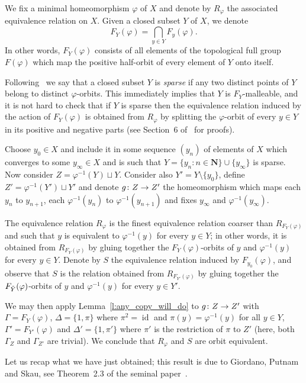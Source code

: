 \documentclass[AHL,Unicode]{cedram}
\DeclareMathOperator{\id}{id}
\newcommand{\N}{\mathbf{N}}
\let\oldtilde\tilde
\renewcommand*{\tilde}[1]{\mathchoice{\widetilde{#1}}{\widetilde{#1}}{\oldtilde{#1}}{\oldtilde{#1}}}
\renewcommand*{\to}{\mathchoice{\longrightarrow}{\rightarrow}{\rightarrow}{\rightarrow}}
\begin{document}
We fix a minimal homeomorphism $\varphi$ of $X$ and denote by $R_\varphi$ the associated equivalence relation on $X$. Given a closed subset $Y$ of $X$, we denote
\[
F_Y(\varphi) = \bigcap_{y \in Y} F_y(\varphi).
\]
In other words, $F_Y(\varphi)$ consists of all elements of the topological full group $F(\varphi)$ which map the positive half-orbit of every element of $Y$ onto itself.

Following~\cite{Melleray2023} we say that a closed subset $Y$ is \emph{sparse} if any two distinct points of $Y$ belong to distinct $\varphi$-orbits. This immediately implies that $Y$ is $F_Y$-malleable, and it is not hard to check that if $Y$ is sparse then the equivalence relation induced by the action of $F_Y(\varphi)$ is obtained from $R_\varphi$ by splitting the $\varphi$-orbit of every $y \in Y$ in its positive and negative parts (see Section~6 of~\cite{Melleray2023} for proofs).

Choose $y_0 \in X$ and include it in some sequence $(y_n)$ of elements of $X$ which converges to some $y_\infty \in X$ and is such that $Y=\{y_n : n \in \N\} \cup\{y_\infty\}$ is sparse. Now consider $Z = \varphi^{-1}(Y) \sqcup Y$. Consider also $Y' = Y \setminus \{y_0\}$, define $Z' = \varphi^{-1}(Y') \sqcup Y'$ and denote $g \colon Z \to Z'$ the homeomorphism which maps each $y_n$ to $y_{n+1}$, each $\varphi^{-1}(y_n)$ to $\varphi^{-1}(y_{n+1})$ and fixes $y_\infty$ and $\varphi^{-1}(y_\infty)$.

The equivalence relation $R_\varphi$ is the finest equivalence relation coarser than $R_{F_Y(\varphi)}$ and such that $y$ is equivalent to $\varphi^{-1}(y)$ for every $y \in Y$; in other words, it is obtained from $R_{F_Y(\varphi)}$ by gluing together the $F_Y(\varphi)$-orbits of $y$ and $\varphi^{-1}(y)$ for every $y \in Y$. Denote by $S$ the equivalence relation induced by $F_{y_0}(\varphi)$, and observe that $S$ is the relation obtained from $R_{F_{Y'}(\varphi)}$ by gluing together the $F_{\tilde Y}(\varphi)$-orbits of $y$ and $\varphi^{-1}(y)$ for every $y \in Y'$.

We may then apply Lemma~\ref{l:any_copy_will_do} to $g \colon Z \to Z'$ with $\Gamma=F_Y(\varphi)$, $\Delta = \{1,\pi \}$ where $\pi^2=\id$ and $\pi(y)= \varphi^{-1}(y)$ for all $y \in Y$, $\Gamma'=F_{Y'}(\varphi)$ and $\Delta'= \{1,\pi' \}$ where $\pi'$ is the restriction of $\pi$ to $Z'$ (here, both $\Gamma_Z$ and $\Gamma_{Z'}$ are trivial). We conclude that $R_\varphi$ and $S$ are orbit equivalent.

Let us recap what we have just obtained; this result is due to Giordano, Putnam and Skau, see Theorem~2.3 of the seminal paper~\cite{Giordano1995}.
\end{document}
